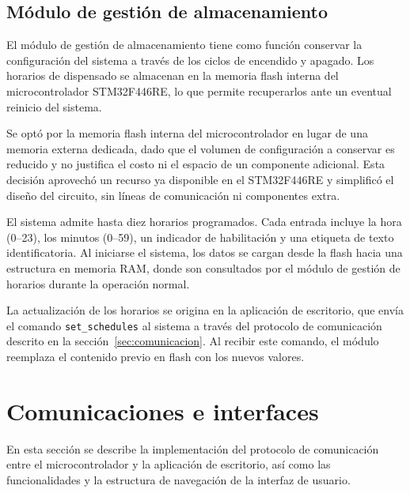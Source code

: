 \subsection{Módulo de gestión de almacenamiento}

El módulo de gestión de almacenamiento tiene como función conservar la configuración del sistema a través de los ciclos de encendido y apagado. Los horarios de dispensado se almacenan en la memoria flash interna del microcontrolador STM32F446RE, lo que permite recuperarlos ante un eventual reinicio del sistema.

Se optó por la memoria flash interna del microcontrolador en lugar de una memoria
externa dedicada, dado que el volumen de configuración a conservar es reducido y
no justifica el costo ni el espacio de un componente adicional. Esta decisión
aprovechó un recurso ya disponible en el STM32F446RE y simplificó el diseño del
circuito, sin líneas de comunicación ni componentes extra.

El sistema admite hasta diez horarios programados. Cada entrada incluye la hora
(0–23), los minutos (0–59), un indicador de habilitación y una etiqueta de texto
identificatoria. Al iniciarse el sistema, los datos se cargan desde la flash hacia
una estructura en memoria RAM, donde son consultados por el módulo de gestión de
horarios durante la operación normal.

La actualización de los horarios se origina en la aplicación de escritorio, que
envía el comando \texttt{set\_schedules} al sistema a través del protocolo de
comunicación descrito en la sección~\ref{sec:comunicacion}. Al recibir este
comando, el módulo reemplaza el contenido previo en flash con los nuevos valores.

\section{Comunicaciones e interfaces}
\label{sec:comunicaciones}

En esta sección se describe la implementación del protocolo de comunicación entre
el microcontrolador y la aplicación de escritorio, así como las funcionalidades
y la estructura de navegación de la interfaz de usuario.

